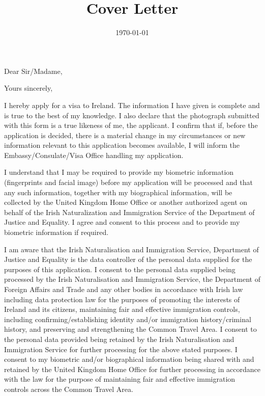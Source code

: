 \documentclass[11pt,a4paper,sans]{moderncv} %
\title{Cover Letter}
\begin{document}


\clearpage

\date{\today} %
\opening{Dear Sir/Madame,} %
\closing{Yours sincerely,} %


\makelettertitle %

I hereby apply for a visa to Ireland. The information I have given is complete and is true to the best of my knowledge. I also declare that the photograph submitted with this form is a true likeness of me, the applicant. I confirm that if, before the application is decided, there is a material change in my circumstances or new information relevant to this application becomes available, I will inform the Embassy/Consulate/Visa Office handling my application.

I understand that I may be required to provide my biometric information (fingerprints and facial image) before my application will be processed and that any such information, together with my biographical information, will be collected by the United Kingdom Home Office or another authorized agent on behalf of the Irish Naturalization and Immigration Service of the Department of Justice and Equality. I agree and consent to this process and to provide my biometric information if required.

I am aware that the Irish Naturalisation and Immigration Service, Department of Justice and Equality is the data controller of the personal data supplied for the purposes of this application. I consent to the personal data supplied being processed by the Irish Naturalisation and Immigration Service, the Department of Foreign Affairs and Trade and any other bodies in accordance with Irish law including data protection law for the purposes of promoting the interests of Ireland and its citizens, maintaining fair and effective immigration controls, including confirming/establishing identity and/or immigration history/criminal history, and preserving and strengthening the Common Travel Area. I consent to the personal data provided being retained by the Irish Naturalisation and Immigration Service for further processing for the above stated purposes. I consent to my biometric and/or biographical information being shared with and retained by the United Kingdom Home Office for further processing in accordance with the law for the purpose of maintaining fair and effective immigration controls across the Common Travel Area.
\end{document}

